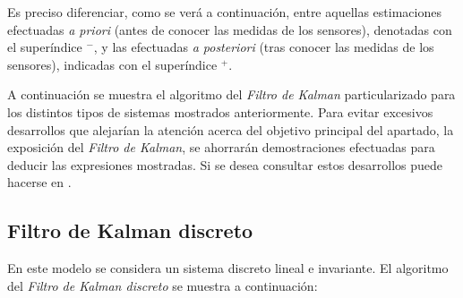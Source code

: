 Es preciso diferenciar, como se verá a continuación, entre aquellas estimaciones efectuadas \emph{a priori} (antes de conocer las medidas de los sensores), denotadas con el superíndice $^-$, y las efectuadas \emph{a posteriori} (tras conocer las medidas de los sensores), indicadas con el superíndice $^+$. \par 

A continuación se muestra el algoritmo del \emph{Filtro de Kalman} particularizado para los distintos tipos de sistemas mostrados anteriormente. Para evitar excesivos desarrollos que alejarían la atención acerca del objetivo principal del apartado, la exposición del \emph{Filtro de Kalman}, se ahorrarán demostraciones efectuadas para deducir las expresiones mostradas. Si se desea consultar estos desarrollos puede hacerse en \cite{simon2006optimal}. \par 

\subsection{Filtro de Kalman discreto}

En este modelo se considera un sistema discreto lineal e invariante. El algoritmo del \emph{Filtro de Kalman discreto} se muestra a continuación:

